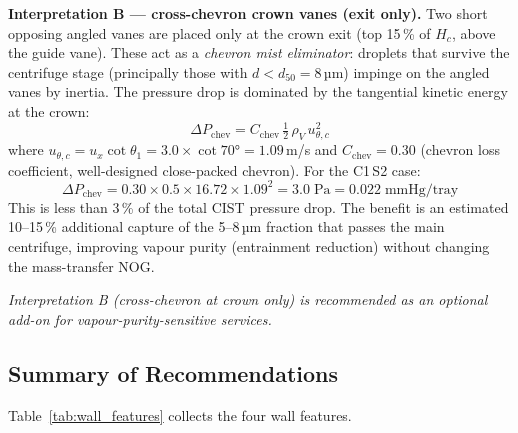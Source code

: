 \documentclass[11pt,letterpaper]{article}
\newcommand{\rhoV}{\rho_V}
\newcommand{\Hc}{H_c}
\begin{document}
\textbf{Interpretation B — cross-chevron crown vanes (exit only).}
Two short opposing angled vanes are placed only at the crown exit
(top 15\,\% of $\Hc$, above the guide vane).  These act as a
\emph{chevron mist eliminator}: droplets that survive the centrifuge stage
(principally those with $d < d_{50} = 8$\,µm) impinge on the angled vanes
by inertia.  The pressure drop is dominated by the tangential kinetic energy
at the crown:
\begin{equation}
  \Delta P_{\mathrm{chev}} = C_{\mathrm{chev}}\,\tfrac12\,\rhoV\,u_{\theta,c}^2
  \label{eq:dp_chev}
\end{equation}
where $u_{\theta,c} = u_x\cot\theta_1 = 3.0 \times \cot 70° = 1.09$\,m/s
and $C_{\mathrm{chev}} = 0.30$ (chevron loss coefficient, well-designed
close-packed chevron).  For the C1\,S2 case:
\[
  \Delta P_{\mathrm{chev}} = 0.30 \times 0.5 \times 16.72 \times 1.09^2
    = 3.0\;\text{Pa} = 0.022\;\text{mmHg/tray}
\]
This is less than 3\,\% of the total CIST pressure drop.  The benefit is an
estimated 10--15\,\% additional capture of the 5--8\,µm fraction that
passes the main centrifuge, improving vapour purity (entrainment
reduction) without changing the mass-transfer NOG.

\emph{Interpretation B (cross-chevron at crown only) is recommended as
an optional add-on for vapour-purity-sensitive services.}

\subsection{Summary of Recommendations}

Table~\ref{tab:wall_features} collects the four wall features.
\end{document}
